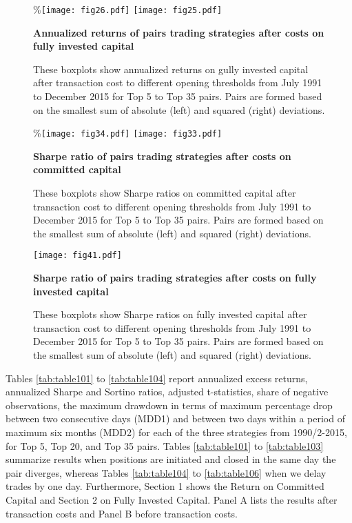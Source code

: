\documentclass[a4paper]{article}
\begin{document}
	\begin{figure}[H]
		\centering
		\%\texttt{[image: fig26.pdf]}
		\texttt{[image: fig25.pdf]}
		\caption{\textbf{Annualized returns of pairs trading strategies after costs on fully invested capital}}
		\caption*{\tiny These boxplots show annualized returns on gully invested capital after transaction cost to different opening thresholds from July 1991 to December 2015 for Top 5 to Top 35 pairs. Pairs are formed based on the smallest sum of absolute (left) and squared (right) deviations.}
		\label{fig:fig25}
	\end{figure}
	
	\begin{figure}[H]
		\centering
		\%\texttt{[image: fig34.pdf]}
		\texttt{[image: fig33.pdf]}
		\caption{\textbf{Sharpe ratio of pairs trading strategies after costs on committed capital}}
		\caption*{\justifying \tiny These boxplots show Sharpe ratios on committed capital after transaction cost to different opening thresholds from July 1991 to December 2015 for Top 5 to Top 35 pairs. Pairs are formed based on the smallest sum of absolute (left) and squared (right) deviations.}
		\label{fig:fig33}
	\end{figure}
	
	\begin{figure}[H]
		\centering \tiny
		\texttt{[image: fig41.pdf]}
		\caption{\textbf {Sharpe ratio of pairs trading strategies after costs on fully invested capital}}
		\caption*{\justifying \tiny These boxplots show Sharpe ratios on fully invested capital after transaction cost to different opening thresholds from July 1991 to December 2015 for Top 5 to Top 35 pairs. Pairs are formed based on the smallest sum of absolute (left) and squared (right) deviations.}
		\label{fig:fig42}
	\end{figure}
	
	
Tables \ref{tab:table101} to \ref{tab:table104} report annualized excess returns, annualized Sharpe and Sortino ratios, \citet*{nw87} adjusted t-statistics, share of negative observations, the maximum drawdown in terms of maximum percentage drop between two consecutive days (MDD1) and between two days within a period of maximum six months (MDD2) for each of the three strategies from 1990/2-2015, for Top 5, Top 20, and Top 35 pairs. Tables \ref{tab:table101} to \ref{tab:table103} summarize results when positions are initiated and closed in the same day the pair diverges, whereas Tables \ref{tab:table104} to \ref{tab:table106} when we delay trades by one day. Furthermore, Section 1 shows the Return on Committed Capital and Section 2 on Fully Invested Capital. Panel A lists the results after transaction costs and Panel B before transaction costs. 	
	
\end{document}
